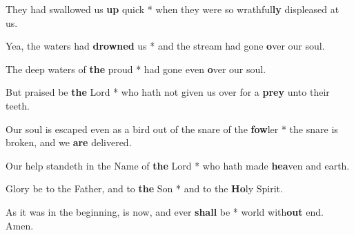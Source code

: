 \begin{multicols}{2}
	They had swallowed us \textbf{up} quick * when they were so wrathful\textbf{ly} displeased at us.
	
	Yea, the waters had \textbf{drowned} us * and the stream had gone \textbf{o}ver our soul.
	
	The deep waters of \textbf{the} proud * had gone even \textbf{o}ver our soul.
	
	But praised be \textbf{the} Lord * who hath not given us over for a \textbf{prey} unto their teeth.
	
	Our soul is escaped even as a bird out of the snare of the \textbf{fow}ler * the snare is broken, and we \textbf{are} delivered.
	
	Our help standeth in the Name of \textbf{the} Lord * who hath made \textbf{hea}ven and earth.
	
	Glory be to the Father, and to \textbf{the} Son * and to the \textbf{Ho}ly Spirit.
	
	As it was in the beginning, is now, and ever \textbf{shall} be * world with\textbf{out} end. Amen.
\end{multicols}